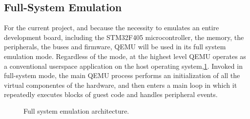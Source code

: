 \subsection{Full-System Emulation}
\label{chap:Back_QEMU_FSE}

For the current project, and because the necessity to emulates an entire development 
board, including the STM32F405 microcontroller, the memory, the peripherals, 
the buses and firmware, QEMU will be used in its full system emulation mode.
Regardless of the mode, at the highest level QEMU operates as a conventional userspace 
application on the host operating system,\ref{fig:full_system_emulation}. Invoked in full-system mode, the 
main QEMU process performs an initialization of all the virtual componentes of the 
hardware, and then enters a main loop in which it repeatedly executes blocks of 
guest code and handles peripheral events.

\begin{figure}[htbp]
    \centering
    \caption{Full system emulation architecture.}
    \label{fig:full_system_emulation}
\end{figure}